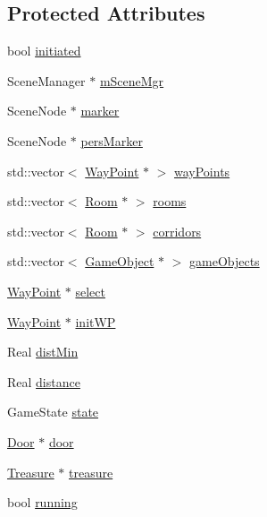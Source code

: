\subsection*{\-Protected \-Attributes}
\begin{DoxyCompactItemize}
\item 
bool \hyperlink{classGame_aea14eeeea7d21e4ec2353957275aa8d9}{initiated}
\item 
\-Scene\-Manager $\ast$ \hyperlink{classGame_a5f59202a5d81c57c0f1c8f8c717067ff}{m\-Scene\-Mgr}
\item 
\-Scene\-Node $\ast$ \hyperlink{classGame_a1ea0118411f7ae6315bc8e48dea4d074}{marker}
\item 
\-Scene\-Node $\ast$ \hyperlink{classGame_a01b72d441b419041c80ba13b17ccd1a3}{pers\-Marker}
\item 
std\-::vector$<$ \hyperlink{classWayPoint}{\-Way\-Point} $\ast$ $>$ \hyperlink{classGame_ad8fcb3fbae1a4b604fc243e5e2717909}{way\-Points}
\item 
std\-::vector$<$ \hyperlink{classRoom}{\-Room} $\ast$ $>$ \hyperlink{classGame_a2224f48ac11275212f97d0bfad0aa5d0}{rooms}
\item 
std\-::vector$<$ \hyperlink{classRoom}{\-Room} $\ast$ $>$ \hyperlink{classGame_ae3be567935e24e323adfd4d49d345f95}{corridors}
\item 
std\-::vector$<$ \hyperlink{classGameObject}{\-Game\-Object} $\ast$ $>$ \hyperlink{classGame_a9fbc762ef50edb2804683eaafb3d45f3}{game\-Objects}
\item 
\hyperlink{classWayPoint}{\-Way\-Point} $\ast$ \hyperlink{classGame_ab249da316eee71f550d2cb8962c1525f}{select}
\item 
\hyperlink{classWayPoint}{\-Way\-Point} $\ast$ \hyperlink{classGame_a9f00f5b2803e11c6916f5b473b16af74}{init\-W\-P}
\item 
\-Real \hyperlink{classGame_a2ad28722eec0aea922bb205220a80fe8}{dist\-Min}
\item 
\-Real \hyperlink{classGame_a77c996af0e47853d824e25a20faecb0d}{distance}
\item 
\-Game\-State \hyperlink{classGame_ad9fc2a8710ee56916f79314b91112ed0}{state}
\item 
\hyperlink{classDoor}{\-Door} $\ast$ \hyperlink{classGame_af92011162a240ad43f9171329e391942}{door}
\item 
\hyperlink{classTreasure}{\-Treasure} $\ast$ \hyperlink{classGame_ad13ac2228cd02743a92666aa7ecdf5ea}{treasure}
\item 
bool \hyperlink{classGame_a8ca5b9f8a62990e6022de17785beac2c}{running}
\end{DoxyCompactItemize}


